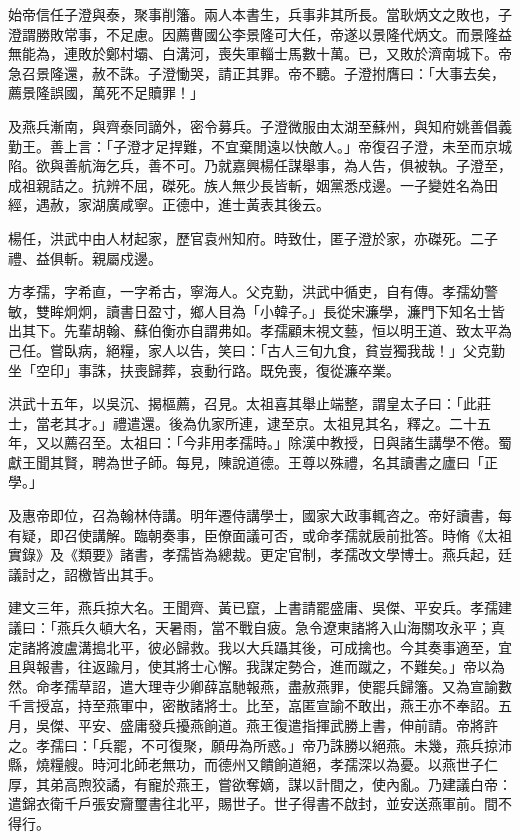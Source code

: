 \begin{pinyinscope}
始帝信任子澄與泰，聚事削籓。兩人本書生，兵事非其所長。當耿炳文之敗也，子澄謂勝敗常事，不足慮。因薦曹國公李景隆可大任，帝遂以景隆代炳文。而景隆益無能為，連敗於鄭村壩、白溝河，喪失軍輜士馬數十萬。已，又敗於濟南城下。帝急召景隆還，赦不誅。子澄慟哭，請正其罪。帝不聽。子澄拊膺曰：「大事去矣，薦景隆誤國，萬死不足贖罪！」

及燕兵漸南，與齊泰同謫外，密令募兵。子澄微服由太湖至蘇州，與知府姚善倡義勤王。善上言：「子澄才足捍難，不宜棄閒遠以快敵人。」帝復召子澄，未至而京城陷。欲與善航海乞兵，善不可。乃就嘉興楊任謀舉事，為人告，俱被執。子澄至，成祖親詰之。抗辨不屈，磔死。族人無少長皆斬，姻黨悉戍邊。一子變姓名為田經，遇赦，家湖廣咸寧。正德中，進士黃表其後云。

楊任，洪武中由人材起家，歷官袁州知府。時致仕，匿子澄於家，亦磔死。二子禮、益俱斬。親屬戍邊。

方孝孺，字希直，一字希古，寧海人。父克勤，洪武中循吏，自有傳。孝孺幼警敏，雙眸炯炯，讀書日盈寸，鄉人目為「小韓子。」長從宋濂學，濂門下知名士皆出其下。先輩胡翰、蘇伯衡亦自謂弗如。孝孺顧末視文藝，恒以明王道、致太平為己任。嘗臥病，絕糧，家人以告，笑曰：「古人三旬九食，貧豈獨我哉！」父克勤坐「空印」事誅，扶喪歸葬，哀動行路。既免喪，復從濂卒業。

洪武十五年，以吳沉、揭樞薦，召見。太祖喜其舉止端整，謂皇太子曰：「此莊士，當老其才。」禮遣還。後為仇家所連，逮至京。太祖見其名，釋之。二十五年，又以薦召至。太祖曰：「今非用孝孺時。」除漢中教授，日與諸生講學不倦。蜀獻王聞其賢，聘為世子師。每見，陳說道德。王尊以殊禮，名其讀書之廬曰「正學。」

及惠帝即位，召為翰林侍講。明年遷侍講學士，國家大政事輒咨之。帝好讀書，每有疑，即召使講解。臨朝奏事，臣僚面議可否，或命孝孺就扆前批答。時脩《太祖實錄》及《類要》諸書，孝孺皆為總裁。更定官制，孝孺改文學博士。燕兵起，廷議討之，詔檄皆出其手。

建文三年，燕兵掠大名。王聞齊、黃已竄，上書請罷盛庸、吳傑、平安兵。孝孺建議曰：「燕兵久頓大名，天暑雨，當不戰自疲。急令遼東諸將入山海關攻永平；真定諸將渡盧溝搗北平，彼必歸救。我以大兵躡其後，可成擒也。今其奏事適至，宜且與報書，往返踰月，使其將士心懈。我謀定勢合，進而蹴之，不難矣。」帝以為然。命孝孺草詔，遣大理寺少卿薛嵓馳報燕，盡赦燕罪，使罷兵歸籓。又為宣諭數千言授嵓，持至燕軍中，密散諸將士。比至，嵓匿宣諭不敢出，燕王亦不奉詔。五月，吳傑、平安、盛庸發兵擾燕餉道。燕王復遣指揮武勝上書，伸前請。帝將許之。孝孺曰：「兵罷，不可復聚，願毋為所惑。」帝乃誅勝以絕燕。未幾，燕兵掠沛縣，燒糧艘。時河北師老無功，而德州又饋餉道絕，孝孺深以為憂。以燕世子仁厚，其弟高煦狡譎，有寵於燕王，嘗欲奪嫡，謀以計間之，使內亂。乃建議白帝：遣錦衣衛千戶張安齎璽書往北平，賜世子。世子得書不啟封，並安送燕軍前。間不得行。


\end{pinyinscope}
